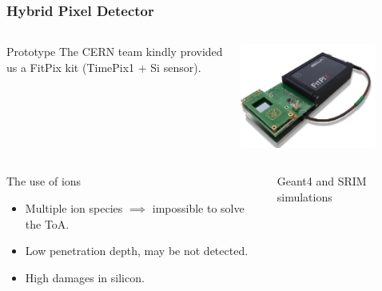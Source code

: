 \begin{frame}[t]
  \frametitle{Hybrid Pixel Detector}
  \begin{columns}[T]
    \begin{column}{0.45\textwidth}
      \begin{block}{Prototype}
        The CERN team kindly provided us a FitPix kit (TimePix1 + Si sensor).
      \end{block}
    \end{column}
    \begin{column}{0.45\textwidth}
      \includegraphics[width=0.8\textwidth]{03_SIM/fig/fig000_FitPix}
    \end{column}
  \end{columns}
  \vskip 0.5cm
  \begin{columns}[T]
    \begin{column}{0.45\textwidth}
      \begin{alertblock}{The use of ions}
        \begin{itemize}
          \item Multiple ion species $\implies$ impossible to solve the ToA.
          \item Low penetration depth, may be not detected.
          \item High damages in silicon.
        \end{itemize}
      \end{alertblock}
    \end{column}
    \begin{column}{0.45\textwidth}
      \centering
      Geant4 and SRIM simulations

\end{column}
\end{columns}
\end{frame}
